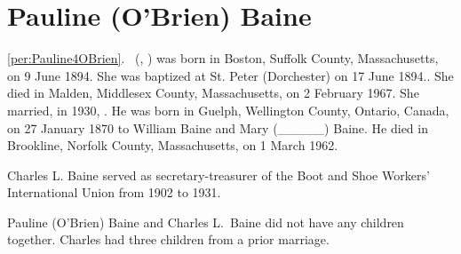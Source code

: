 \section{Pauline (O'Brien) Baine}

\ref{per:Pauline4OBrien}.\  (, ) was born in Boston, Suffolk County, Massachusetts, on 9 June 1894.\cite{Pauline4OBrienBirth} She was baptized at St. Peter (Dorchester) on 17 June 1894.\cite{Pauline4OBrienBaptism}. She died in Malden, Middlesex County, Massachusetts, on 2 February 1967.\cite{Pauline4OBrienDeath} She married, in 1930, .\cite{CharlesBaineMarriage} He was born in Guelph, Wellington County, Ontario, Canada, on 27 January 1870\cite{CharlesBainePassport} to William Baine and Mary (\_\_\_\_\_) Baine.\cite{Census1880CharlesBaine} He died in Brookline, Norfolk County, Massachusetts, on 1 March 1962.\cite{CharlesBaineDeath}

Charles L. Baine served as secretary-treasurer of the Boot and Shoe Workers' International Union from 1902 to 1931.\cite{Gompers}

Pauline (O'Brien) Baine and Charles L.\ Baine did not have any children together.\cite{Pauline4OBrienDeath2} Charles had three children from a prior marriage.\cite{CharlesBaineDeath}